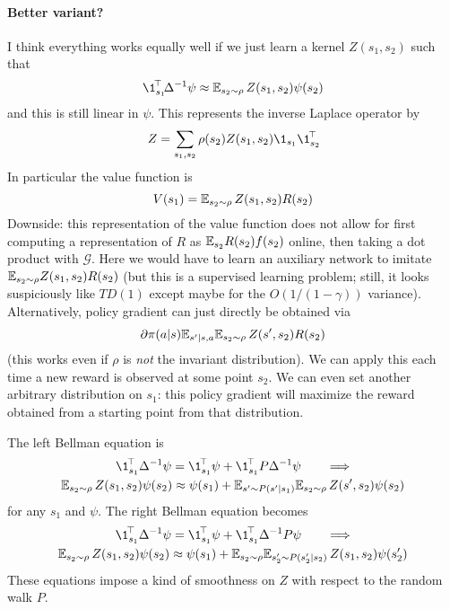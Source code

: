 \documentclass[11pt,a4paper]{article}
\newcommand{\green}{\mathcal{G}}
\begin{document}
\paragraph{Better variant?}
I think
everything works equally well if we just learn a kernel $Z(s_1,s_2)$ such
that
\begin{equation}
\transp{\1_{s_1}}\Delta^{-1}\psi\approx \E_{s_2\sim \rho} \,Z(s_1,s_2)
\psi(s_2)
\end{equation}
and this is still linear in $\psi$. This represents the inverse Laplace
operator by
\begin{equation}
Z=\sum_{s_1,s_2}\rho(s_2)  Z(s_1,s_2)\1_{s_1}\transp{\1_{s_2}}
\end{equation}
In particular the value function is
\begin{equation}
V(s_1)=\mathbb{E}_{s_2\sim \rho} \, Z(s_1,s_2) R(s_2)
\end{equation}
Downside: this representation of the value function does not allow for first
computing a representation of $R$ as $\mathbb{E}_{s_2} R(s_2)f(s_2)$ online, then taking a dot product with
$\green$. Here we would have to learn an auxiliary network to imitate
$\mathbb{E}_{s_2\sim \rho} Z(s_1,s_2) R(s_2)$ (but this is a supervised learning
problem; still, it looks suspiciously like $TD(1)$ except maybe for the
$O(1/(1-\gamma))$ variance). Alternatively, policy gradient can just directly be obtained
via
\begin{equation}
\partial \pi(a|s)\mathbb{E}_{s'|s,a} \mathbb{E}_{s_2\sim \rho} \, Z(s',s_2)R(s_2)
\end{equation}
(this works even if $\rho$ is \emph{not} the invariant distribution). We
can apply this each time a new reward is observed at some point $s_2$. We
can even set another arbitrary distribution on $s_1$: this policy
gradient will maximize
the reward obtained from a starting point from that distribution.

The left Bellman equation is
\begin{gather}
\transp{\1_{s_1}}\,\Delta^{-1}\psi=\transp{\1_{s_1}}\,\psi+\transp{\1_{s_1}}\,P\Delta^{-1}\psi
\qquad \Longrightarrow
\\
\E_{s_2\sim \rho}
\,Z(s_1,s_2)\psi(s_2)
\approx \psi(s_1)+ \E_{s'\sim P(s'|s_1)}
\E_{s_2\sim \rho}\,
Z(s',s_2)\psi(s_2)
\end{gather}
for any $s_1$ and $\psi$.
The right Bellman equation becomes
\begin{gather}
\transp{\1_{s_1}}\,\Delta^{-1}\psi=\transp{\1_{s_1}}\,\psi+\transp{\1_{s_1}}\,\Delta^{-1}P\psi
\qquad \Longrightarrow
\\
\E_{s_2\sim \rho}\,
Z(s_1,s_2)\psi(s_2)
\approx \psi(s_1)+ \E_{s_2\sim \rho}\E_{s'_2\sim P(s'_2|s_2)}\,
Z(s_1,s_2)\psi(s'_2)
\end{gather}
These equations impose a kind of smoothness on $Z$ with respect to the
random walk $P$.
\end{document}
